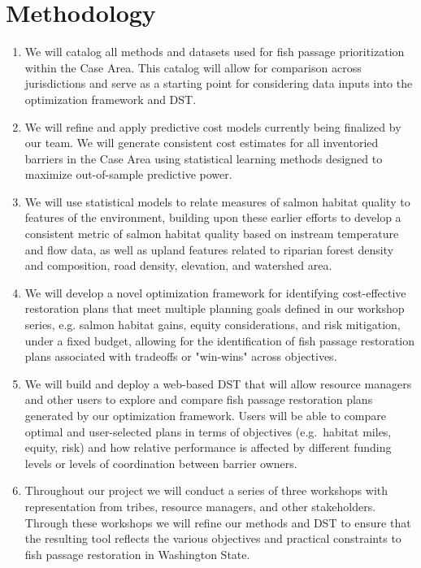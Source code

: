 \documentclass[12pt]{elsarticle}
\begin{document}
		\section{Methodology} 
			\begin{enumerate}
				\item We will catalog all methods and datasets used for fish passage prioritization within the Case Area. This catalog will allow for comparison across jurisdictions and serve as a starting point for considering data inputs into the optimization framework and DST.
				\item We will refine and apply predictive cost models currently being finalized by our team. We will generate consistent cost estimates for all inventoried barriers in the Case Area using statistical learning methods designed to maximize out-of-sample predictive power.
				\item We will use statistical models to relate measures of salmon habitat quality to features of the environment, building upon these earlier efforts to develop a consistent metric of salmon habitat quality based on instream temperature and flow data, as well as upland features related to riparian forest density and composition, road density, elevation, and watershed area.
				\item We will develop a novel optimization framework for identifying cost-effective restoration plans that meet multiple planning
				goals defined in our workshop series, e.g. salmon habitat gains, equity considerations, and risk mitigation, under a fixed budget, allowing for the identification of fish passage restoration plans associated with tradeoffs or "win-wins" across objectives.
				\item We will build and deploy a web-based DST that will allow resource managers and other users to explore and compare fish passage restoration plans generated by our optimization framework. Users will be able to compare optimal and user-selected plans in terms of objectives (e.g.\ habitat miles, equity, risk) and how relative performance is affected by different funding levels or levels of coordination between barrier owners.
				\item Throughout our project we will conduct a series of three workshops with representation from tribes, resource managers, and other stakeholders. Through these workshops we will refine our methods and DST to ensure that the resulting tool reflects the various objectives and practical constraints to fish passage restoration in Washington State.
			\end{enumerate}
\end{document}
